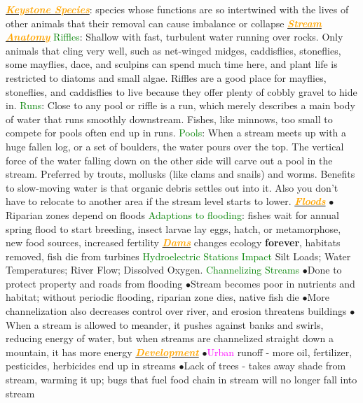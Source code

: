 \documentclass{article}
\newcommand{\ddd}{$\bullet$}
\newcommand{\green}[1]{\textcolor{green}{#1}}
\newcommand{\pink}[1]{\textcolor{magenta}{#1}}
\newcommand{\orange}[1]{\textcolor{orange}{#1}}
\newcommand{\mysubsection}[1]{\underline{\textbf{{\textit{\orange{#1}}}}}}
\newcommand{\mysubsub}[1]{{{\green{#1}}}}
\newcommand{\vocab}[1]{{\pink{#1}}}
\begin{document}
\begin{multicols*}{4}
        \mysubsection{Keystone Species}:  species whose functions are so intertwined with the lives of other animals that their removal can cause imbalance or collapse
        \mysubsection{Stream Anatomy} 
        	\mysubsub{Riffles}: Shallow with fast, turbulent water running over rocks. Only animals that cling very well, such as net-winged midges, caddisflies, stoneflies, some mayflies, dace, and sculpins can spend much time here, and plant life is restricted to diatoms and small algae. Riffles are a good place for mayflies, stoneflies, and caddisflies to live because they offer plenty of cobbly gravel to hide in.
        	\mysubsub{Runs}: Close to any pool or riffle is a run, which merely describes a main body of water that runs smoothly downstream. Fishes, like minnows, too small to compete for pools often end up in runs.
        	\mysubsub{Pools}: When a stream meets up with a huge fallen log, or a set of boulders, the water pours over the top. The vertical force of the water falling down on the other side will carve out a pool in the stream. Preferred by trouts, mollusks (like clams and snails) and worms. Benefits to slow-moving water is that organic debris settles out into it. Also you don't have to relocate to another area if the stream level starts to lower.
        \mysubsection{Floods}
            \ddd Riparian zones depend on floods
            \mysubsub{Adaptions to flooding}: fishes wait for annual spring flood to start breeding, insect larvae lay eggs, hatch, or metamorphose, new food sources, increased fertility
        \mysubsection{Dams}
            changes ecology \textbf{forever}, habitats removed, fish die from turbines
            \mysubsub{Hydroelectric Stations Impact}
                Silt Loads; Water Temperatures; River Flow; Dissolved Oxygen. 
            \mysubsub{Channelizing Streams}
                \ddd Done to protect property and roads from flooding
                \ddd Stream becomes poor in nutrients and habitat; without periodic flooding, riparian zone dies, native fish die
                \ddd More channelization also decreases control over river, and erosion threatens buildings
                \ddd When a stream is allowed to meander, it pushes against banks and swirls, reducing energy of water, but when streams are channelized straight down a mountain, it has more energy
        \mysubsection{Development}
            \ddd \vocab{Urban} runoff - more oil, fertilizer, pesticides, herbicides end up in streams
            \ddd Lack of trees - takes away shade from stream, warming it up; bugs that fuel food chain in stream will no longer fall into stream

\end{multicols*}
\end{document}
